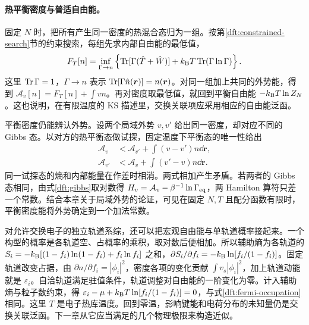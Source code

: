 \paragraph{热平衡密度与普适自由能。}
固定 $N$ 时，把所有产生同一密度的热混合态归为一组。按第\ref{dft:constrained-search}节的约束搜索，每组先求内部自由能的最低值，
\begin{equation}
 F_T[n]=\inf_{\Gamma\to n}\left\{\operatorname{Tr}[\Gamma(\hat T+\hat W)]
               +k_{\mathrm B} T\operatorname{Tr}(\Gamma\ln\Gamma)\right\}.
\end{equation}
这里 $\operatorname{Tr}\Gamma=1$，$\Gamma\to n$ 表示 $\operatorname{Tr}[\Gamma\hat n(\bm r)]=n(\bm r)$。对同一组加上共同的外势能，得到 $\mathcal A_v[n]=F_T[n]+\int vn$。再对密度取最低值，就回到平衡自由能 $-k_{\mathrm B} T\ln Z_N$。这也说明，在有限温度的 KS 描述里，交换关联项应采用相应的自由能泛函。

平衡密度仍能辨认外势。设两个局域外势 $v,v'$ 给出同一密度，却对应不同的 Gibbs 态。以对方的热平衡态做试探，固定温度下平衡态的唯一性给出
\begin{align}
 \mathcal A_v&<\mathcal A_{v'}+\int(v-v')n\dd\bm r,\\
 \mathcal A_{v'}&<\mathcal A_v+\int(v'-v)n\dd\bm r .
\end{align}
同一试探态的熵和内部能量在作差时相消。两式相加产生矛盾。若两者的 Gibbs 态相同，由式\eqref{dft:gibbs}取对数得 $H_v=\mathcal A_v-\beta^{-1}\ln\Gamma_{\rm eq}$，两 Hamilton 算符只差一个常数。结合本章关于局域外势的论证，可见在固定 $N,T$ 且配分函数有限时，平衡密度能将外势确定到一个加法常数。

对允许交换电子的独立轨道系综，还可以把宏观自由能与单轨道概率接起来。一个构型的概率是各轨道空、占概率的乘积，取对数后便相加。所以辅助熵为各轨道的 $S_i=-k_{\mathrm B}[(1-f_i)\ln(1-f_i)+f_i\ln f_i]$ 之和，$\partial S_i/\partial f_i=-k_{\mathrm B}\ln[f_i/(1-f_i)]$。固定轨道改变占据，由 $\partial n/\partial f_i=|\phi_i|^2$，密度各项的变化贡献 $\int v_s|\phi_i|^2$，加上轨道动能就是 $\varepsilon_i$。自洽轨道满足驻值条件，轨道调整对自由能的一阶变化为零。计入辅助熵与粒子数约束，得 $\varepsilon_i-\mu+k_{\mathrm B} T\ln[f_i/(1-f_i)]=0$，与式\eqref{dft:fermi-occupation}相同。这里 $T$ 是电子热库温度。回到零温，影响键能和电荷分布的未知量仍是交换关联泛函。下一章从它应当满足的几个物理极限来构造近似。
